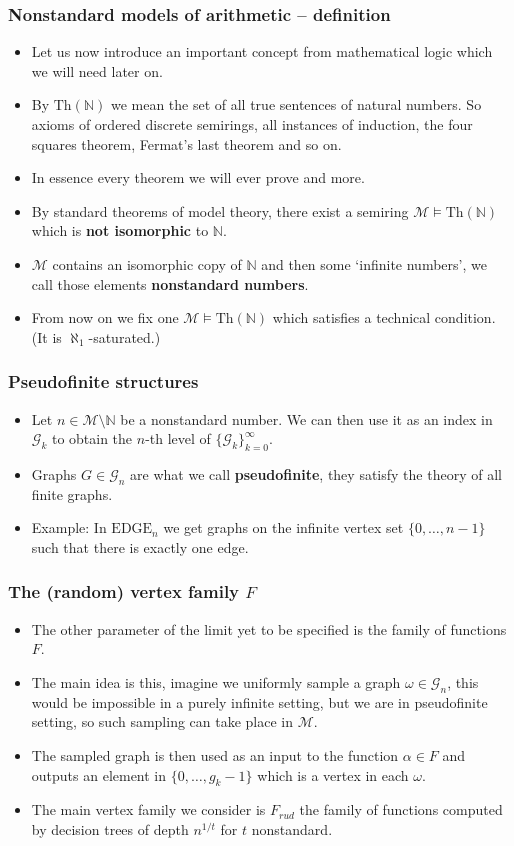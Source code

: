 \documentclass{beamer}
\newcommand{\N}{\mathbb{N}}
\newcommand{\M}{\mathcal{M}}
\newcommand{\G}{\mathcal{G}}
\newcommand{\0}{\textbf{0}}
\newcommand{\1}{\textbf{1}}
\newcommand{\Th}{\text{Th}}
\newcommand{\EDGE}{\text{EDGE}}
\begin{document}
\begin{frame}
\frametitle{Nonstandard models of arithmetic -- definition}
\begin{itemize}[<+->]
\item Let us now introduce an important concept from mathematical logic which we will need later on.
\item By $\Th(\N)$ we mean the set of all true sentences of natural numbers. So axioms of ordered discrete semirings, all instances of induction, the four squares theorem, Fermat's last theorem and so on. 
\item In essence every theorem we will ever prove and more.
\item By standard theorems of model theory, there exist a semiring $\M\models \Th(\N)$ which is \textbf{not isomorphic} to $\N$.
\item $\M$ contains an isomorphic copy of $\N$ and then some `infinite numbers', we call those elements \textbf{nonstandard numbers}.
\item From now on we fix one $\M\models\Th(\N)$ which satisfies a technical condition. (It is $\aleph_1$-saturated.)
\end{itemize}
\end{frame}

\begin{frame}
\frametitle{Pseudofinite structures}
\begin{itemize}[<+->]
\item Let $n\in \M\setminus \N$ be a nonstandard number. We can then use it as an index in $\G_k$ to obtain the $n$-th level of $\{\G_k\}_{k=0}^\infty$. 
\item Graphs $G\in \G_n$ are what we call \textbf{pseudofinite}, they satisfy the theory of all finite graphs.
\item Example: In $\EDGE_n$ we get graphs on the infinite vertex set $\{0,\dots, n-1\}$ such that there is exactly one edge.
\end{itemize}
\end{frame}

\begin{frame}
\frametitle{The (random) vertex family $F$}

\begin{itemize}[<+->]
\item The other parameter of the limit yet to be specified is the family of functions $F$.
\item The main idea is this, imagine we uniformly sample a graph $\omega\in\G_n$, this would be impossible in a purely infinite setting, but we are in pseudofinite setting, so such sampling can take place in $\M$.
\item The sampled graph is then used as an input to the function $\alpha \in F$ and outputs an element in $\{0,\dots,g_k-1\}$ which is a vertex in each $\omega$.
\item The main vertex family we consider is $F_{rud}$ the family of functions computed by decision trees of depth $n^{1/t}$ for $t$ nonstandard.
\end{itemize}
\end{frame}
\end{document}
